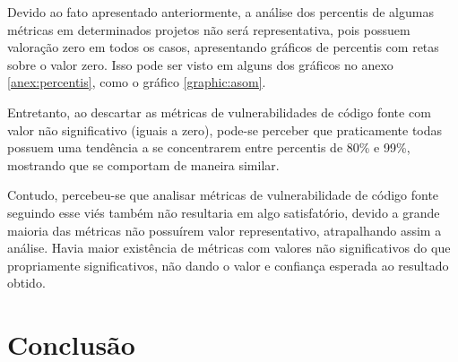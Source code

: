 Devido ao fato apresentado anteriormente, a análise dos percentis de algumas métricas em determinados projetos não será 
representativa, pois possuem valoração zero em todos os casos, apresentando gráficos de percentis com retas sobre o valor 
zero. Isso pode ser visto em alguns dos gráficos no anexo
\ref{anex:percentis}, como o gráfico \ref{graphic:asom}.

Entretanto, ao descartar as métricas de vulnerabilidades de código fonte com
valor não significativo (iguais a zero), pode-se perceber que praticamente
todas possuem uma tendência a se concentrarem entre percentis de 80\% e 99\%, mostrando que se
comportam de maneira similar.

Contudo, percebeu-se que analisar métricas de vulnerabilidade de código fonte
seguindo esse viés também não resultaria em algo satisfatório, devido a grande
maioria das métricas não possuírem valor representativo, atrapalhando assim
a análise. Havia maior existência de métricas com valores não
significativos do que propriamente significativos, não dando o valor e
confiança esperada ao resultado obtido.

\section{Conclusão}
